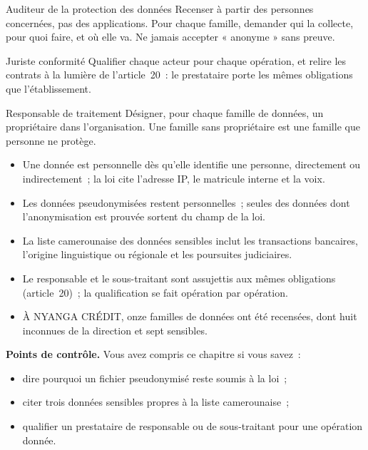 \begin{boxmetier}{Auditeur de la protection des données}
Recenser à partir des personnes concernées, pas des applications. Pour
chaque famille, demander qui la collecte, pour quoi faire, et où elle va.
Ne jamais accepter « anonyme » sans preuve.
\end{boxmetier}

\begin{boxmetier}{Juriste conformité}
Qualifier chaque acteur pour chaque opération, et relire les contrats à la
lumière de l'article~20~: le prestataire porte les mêmes obligations que
l'établissement.
\end{boxmetier}

\begin{boxmetier}{Responsable de traitement}
Désigner, pour chaque famille de données, un propriétaire dans
l'organisation. Une famille sans propriétaire est une famille que personne
ne protège.
\end{boxmetier}

\begin{boxresume}
\begin{itemize}
    \item Une donnée est personnelle dès qu'elle identifie une personne,
          directement ou indirectement~; la loi cite l'adresse IP, le
          matricule interne et la voix.
    \item Les données pseudonymisées restent personnelles~; seules des
          données dont l'anonymisation est prouvée sortent du champ de la
          loi.
    \item La liste camerounaise des données sensibles inclut les
          transactions bancaires, l'origine linguistique ou régionale et les
          poursuites judiciaires.
    \item Le responsable et le sous-traitant sont assujettis aux mêmes
          obligations (article~20)~; la qualification se fait opération par
          opération.
    \item À NYANGA CRÉDIT, onze familles de données ont été recensées, dont
          huit inconnues de la direction et sept sensibles.
\end{itemize}
\end{boxresume}

\begin{boxinfo}
\textbf{Points de contrôle.} Vous avez compris ce chapitre si vous savez~:
\begin{itemize}
    \item dire pourquoi un fichier pseudonymisé reste soumis à la loi~;
    \item citer trois données sensibles propres à la liste camerounaise~;
    \item qualifier un prestataire de responsable ou de sous-traitant pour
          une opération donnée.
\end{itemize}
\end{boxinfo}

